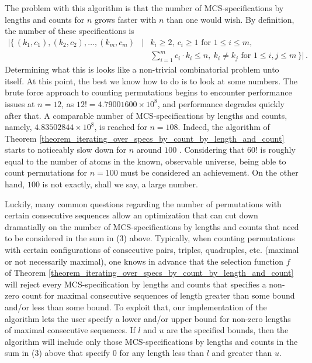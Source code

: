 \documentclass{article}
\begin{document}
The problem with this algorithm is that the number of MCS-specifications by lengths and counts
for $n$ grows faster with $n$ than one would wish. By definition, the number of these specifications is
\begin{eqnarray*}
  \big|\{\,(k_1, c_1), (k_2, c_2), \ldots,(k_m, c_m) & \mid & k_i \geq 2,\ c_i \geq 1 \text{ for } 1\leq i \leq m,\\
                                                 &      & \sum_{i=1}^m c_i \cdot k_i \leq n,\
                                                          k_i\neq k_j\text{ for } 1\leq i,j \leq m \,\}\big|\,.
\end{eqnarray*}
Determining what this is looks like a non-trivial combinatorial problem unto itself.
At this point, the best we know how to do is to look at some numbers. The brute force
approach to counting permutations begins to encounter performance issues at $n=12$, as
$12!=4.79001600\times 10^8$, and performance degrades quickly after that.
A comparable number of MCS-specifications by lengths and counts,
namely, $4.83502844\times 10^8$, is reached for $n=108$. Indeed, the algorithm of Theorem
\ref{theorem_iterating_over_specs_by_count_by_length_and_count} starts to noticeably slow
down for $n$ around $100$ \cite{Performance}. Considering that $60!$ is roughly equal to the number of atoms
in the known, observable universe, being able to count permutations for $n=100$ must be
considered an achievement. On the other hand, $100$ is not exactly, shall we say, a large number.

Luckily, many common questions regarding the number of permutations with certain consecutive
sequences allow an optimization that can cut down dramatially on the number of MCS-specifications
by lengths and counts that need to be considered in the sum in (3) above. Typically, when counting
permutations with certain configurations of consecutive pairs, triples, quadruples, etc.
(maximal or not necessarily maximal), one knows in advance that the selection function $f$ of
Theorem \ref{theorem_iterating_over_specs_by_count_by_length_and_count} will reject every
MCS-specification by lengths and counts that specifies a non-zero count for maximal consecutive
sequences of length greater than some bound and/or less than some bound. To exploit that,
our implementation of the algorithm \cite{Algos} lets the user specify a
lower and/or upper bound for non-zero lengths
of maximal consecutive sequences. If $l$ and $u$ are the specified bounds, then the algorithm
will include only those MCS-specifications by lengths and counts in the sum in (3) above that
specify 0 for any length less than $l$ and greater than $u$.
\end{document}
